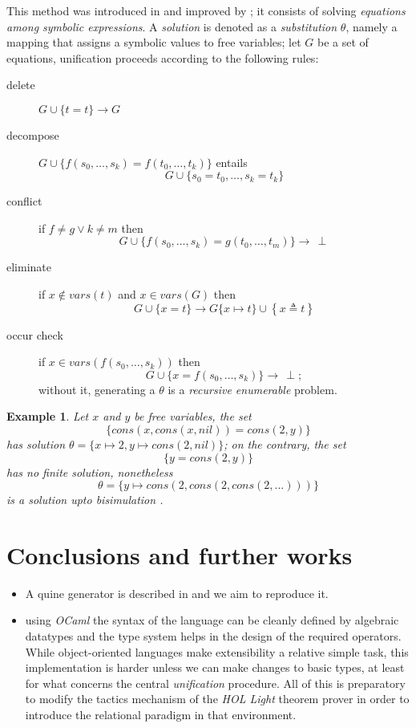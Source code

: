 \documentclass[a4paper,12pt]{article}
\newtheorem{example}[theorem]{Example}
\begin{document}
This method was introduced in \citep{robinson_unif} and
improved by \citep{Martelli:1982:EUA:357162.357169}; it consists of solving
\textit{equations among symbolic expressions}. A \textit{solution} is denoted
as a \textit{substitution} $\theta$, namely a mapping that assigns a symbolic
values to free variables; let $G$ be a set of equations, unification proceeds
according to the following rules:
\begin{description}
\item[delete] $G \cup \lbrace t = t \rbrace \rightarrow G$
\item[decompose] $G \cup \lbrace f(s_{0}, \ldots, s_{k}) = f(t_{0}, \ldots, t_{k})\rbrace$ entails
$$G \cup \lbrace s_{0}=t_{0},\ldots, s_{k}=t_{k} \rbrace$$
\item[conflict] if $f\neq g \vee k\neq m$ then $$G \cup \lbrace f(s_{0}, \ldots, s_{k}) = g(t_{0}, \ldots, t_{m})\rbrace \rightarrow \,\perp$$
\item[eliminate] if $x \not\in vars(t)$ and $x \in vars(G)$ then $$G \cup \lbrace x = t\rbrace \rightarrow G\lbrace x \mapsto t\rbrace \cup \left\lbrace x \triangleq t\right\rbrace $$
\item[occur check] if $x \in vars(f(s_{0},\ldots,s_{k}))$ then $$G \cup \lbrace x = f(s_{0}, \ldots, s_{k})\rbrace \rightarrow \,\perp;$$
without it, generating a $\theta$ is a
\emph{recursive enumerable} problem.
\end{description}

\begin{example}
Let $x$ and $y$ be free variables, the set
$$\lbrace cons(x,cons(x,nil)) = cons(2,y)\rbrace$$
has solution $\theta = \lbrace x \mapsto 2, y \mapsto cons(2,nil) \rbrace$;
on the contrary, the set
$$ \lbrace y = cons(2,y) \rbrace $$
has no \textit{finite} solution, nonetheless
$$\theta = \lbrace y \mapsto cons(2,cons(2,cons(2,...))) \rbrace$$
is a solution upto \textit{bisimulation}
\citep{10.1007/BFb0017309, DBLP:books/daglib/0067019}.
\end{example}
\section{Conclusions and further works}


\begin{itemize}
\item A quine generator is described in \citep{Byrd:2012:MLU:2661103.2661105}
and we aim to reproduce it.

\item using \emph{OCaml} the syntax of the language can be cleanly defined by
algebraic datatypes and the type system helps in the design of the required
operators.  While object-oriented languages make extensibility a relative
simple task, this implementation is harder unless we can make changes to basic
types, at least for what concerns the central \emph{unification} procedure.
All of this is preparatory to modify the tactics mechanism of the \emph{HOL
Light} theorem prover in order to introduce the relational paradigm in that
environment.
\end{itemize}



\end{document}
